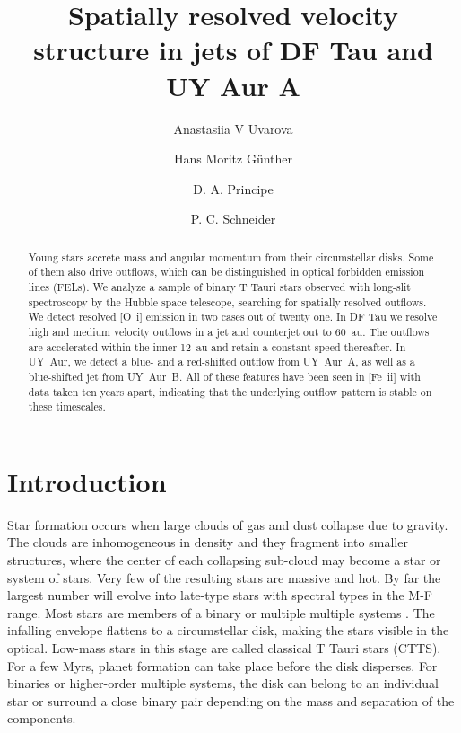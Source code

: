 \documentclass[twocolumn]{aastex62}
\begin{document}
\title{Spatially resolved velocity structure in jets of DF Tau and UY Aur A}



\author{Anastasiia V Uvarova}

\author[0000-0003-4243-2840]{Hans Moritz G\"unther}

\author{D. A. Principe}

\author{P. C. Schneider}

\begin{abstract}
Young stars accrete mass and angular momentum from their circumstellar
disks. Some of them also drive outflows, which can be distinguished in
optical forbidden emission lines (FELs). We analyze a sample of binary
T Tauri stars observed with long-slit spectroscopy by the Hubble space
telescope, searching for spatially resolved outflows. We detect resolved [O~{\sc i}] emission in two cases out of twenty one. In DF Tau we resolve high and medium velocity outflows in a jet and counterjet out to 60~au. The outflows are accelerated within the inner 12~au and retain a constant speed thereafter. In UY~Aur, we detect a blue- and a red-shifted outflow from UY~Aur~A, as well as a blue-shifted jet from UY~Aur~B. All of these features have been seen in [Fe~{\sc ii}] with data taken ten years apart, indicating that the underlying outflow pattern is stable on these timescales.
\end{abstract}%


\section{Introduction}
\label{sect:intro}
Star formation occurs when large clouds of gas and dust collapse due to
gravity. The clouds are inhomogeneous in density and they fragment into
smaller structures, where the center of each collapsing sub-cloud may
become a star or system of stars. Very few of the resulting stars are
massive and hot. By far the largest number will evolve into late-type
stars with spectral types in the M-F range. Most stars are members of a binary or multiple multiple systems \citep[see e.g.\ review by][]{2007prpl.conf..379D}.
The infalling envelope
flattens to a circumstellar disk, making the stars visible in the
optical. Low-mass stars in this stage are called classical T Tauri stars
(CTTS). For a few Myrs, planet formation can take place before the disk
disperses. For binaries or higher-order multiple systems, the disk can
belong to an individual star or surround a close binary pair depending
on the mass and separation of the components.
\end{document}
